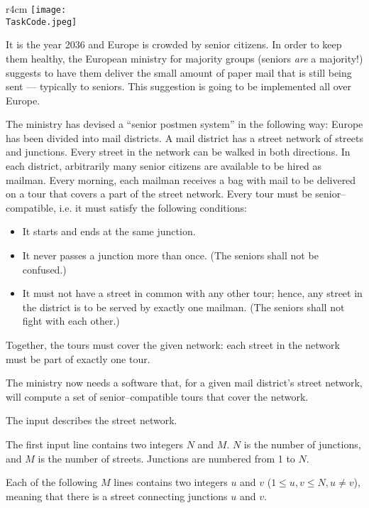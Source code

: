 \documentclass{boi2014}
\renewcommand{\TaskCode}{postmen}
\begin{document}
    \begin{wrapfigure}[8]{r}{4cm}
        \vspace{-18pt}
		\texttt{[image: \\TaskCode.jpeg]}
	\end{wrapfigure}
    It is the year 2036 and Europe is crowded by senior citizens. In order to
    keep them healthy, the European ministry for majority groups (seniors
    \emph{are} a majority!) suggests to have them deliver the small amount of
    paper mail that is still being sent --- typically to seniors. This
    suggestion is going to be implemented all over Europe.

    The ministry has devised a ``senior postmen system'' in the following way:
    Europe has been divided into mail districts. A mail district has a street
    network of streets and junctions. Every street in the network can be walked
    in both directions. In each district, arbitrarily many senior citizens are
    available to be hired as mailman. Every morning, each mailman receives a bag
    with mail to be delivered on a tour that covers a part of the street
    network. Every tour must be senior--compatible, i.e. it must satisfy the
    following conditions:

    \begin{itemize}
        \item It starts and ends at the same junction.
        \item It never passes a junction more than once. (The seniors shall not
        be confused.)
        \item It must not have a street in common with any other tour; hence,
        any street in the district is to be served by exactly one mailman. (The
        seniors shall not fight with each other.)
    \end{itemize}

    Together, the tours must cover the given network: each street in the network
    must be part of exactly one tour.

    \Task
    The ministry now needs a software that, for a given mail district’s street
    network, will compute a set of senior--compatible tours that cover the
    network.

    \Input
    The input describes the street network.

    The first input line contains two integers $N$ and $M$. $N$ is the number of
    junctions, and $M$ is the number of streets. Junctions are numbered from 1
    to $N$.

    Each of the following $M$ lines contains two integers $u$ and $v$
    ($1 \le u, v \le N, u \neq v$), meaning that
    there is a street connecting junctions $u$ and $v$.
\end{document}
